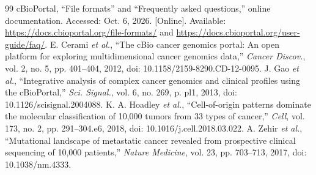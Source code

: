 \begin{thebibliography}{99}
 cBioPortal, ``File formats'' and ``Frequently asked questions,'' online documentation. Accessed: Oct. 6, 2026. [Online]. Available: \url{https://docs.cbioportal.org/file-formats/} and \url{https://docs.cbioportal.org/user-guide/faq/}.
 E. Cerami \emph{et al.}, ``The cBio cancer genomics portal: An open platform for exploring multidimensional cancer genomics data,'' \emph{Cancer Discov.}, vol. 2, no. 5, pp. 401--404, 2012, doi: 10.1158/2159-8290.CD-12-0095.
 J. Gao \emph{et al.}, ``Integrative analysis of complex cancer genomics and clinical profiles using the cBioPortal,'' \emph{Sci. Signal.}, vol. 6, no. 269, p. pl1, 2013, doi: 10.1126/scisignal.2004088.
 K. A. Hoadley \emph{et al.}, ``Cell-of-origin patterns dominate the molecular classification of 10,000 tumors from 33 types of cancer,'' \emph{Cell}, vol. 173, no. 2, pp. 291--304.e6, 2018, doi: 10.1016/j.cell.2018.03.022.
 A. Zehir \emph{et al.}, ``Mutational landscape of metastatic cancer revealed from prospective clinical sequencing of 10,000 patients,'' \emph{Nature Medicine}, vol. 23, pp. 703--713, 2017, doi: 10.1038/nm.4333.
\end{thebibliography}
